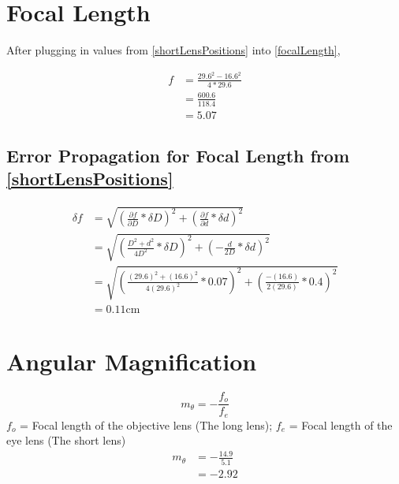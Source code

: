 \documentclass{report}
\begin{document}
\section{Focal Length}


After plugging in values from \ref{shortLensPositions} into \ref{focalLength},

$$
    \begin{aligned}
        f & =\frac{29.6^{2}-16.6^{2}}{4*29.6} \\
          & =\frac{600.6}{118.4}              \\
          & =5.07
    \end{aligned}
$$

\subsection{Error Propagation for Focal Length from \ref{shortLensPositions}}
$$
    \begin{aligned}
        \delta f & =\sqrt{\left(\frac{\partial f}{\partial D} * \delta D\right)^2+\left(\frac{\partial f}{\partial d} * \delta d\right)^2} \\
                 & =\sqrt{\left(\frac{D^{2}+d^{2}}{4 D^{2}} * \delta D\right)^2+\left(-\frac{d}{2 D} * \delta d\right)^2}                  \\
                 & =\sqrt{\left(\frac{(29.6)^{2}+(16.6)^{2}}{4(29.6)^{2}} * 0.07\right)^2+\left(\frac{-(16.6)}{2(29.6)} * 0.4\right)^2}    \\
                 & =0.11 \mathrm{cm}
    \end{aligned}
$$



\section{Angular Magnification}

$$
    m_{\theta} =-\frac{f_{o}}{f_{e}}
$$
{\scriptsize $f_o$ = Focal length of the objective lens (The long lens); $f_e$ = Focal length of the eye lens (The short lens)}
$$
    \begin{aligned}
        m_{\theta} & =-\frac{14.9}{5.1} \\
                   & =-2.92
    \end{aligned}
$$
\end{document}
